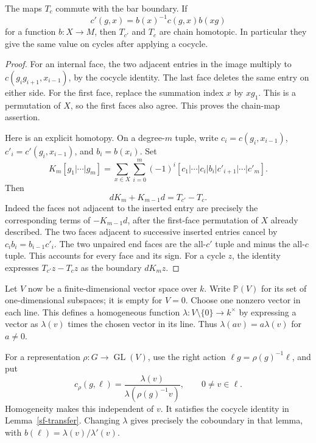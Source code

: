 \begin{lemma}\label{sf-transfer}
The maps \(T_c\) commute with the bar boundary.
If
\[
                c'(g,x)=b(x)^{-1}c(g,x)b(xg)
\]
for a function \(b:X\to M\), then \(T_{c'}\) and
\(T_c\) are chain homotopic.  In particular they give
the same value on cycles after applying a cocycle.
\end{lemma}
\begin{proof}
For an internal face, the two adjacent entries in
the image multiply to \(c(g_ig_{i+1},x_{i-1})\),
by the cocycle identity.  The last face deletes the
same entry on either side.  For the first face,
replace the summation index \(x\) by \(xg_1\).
This is a permutation of \(X\), so the first faces
also agree.  This proves the chain-map assertion.

Here is an explicit homotopy.  On a degree-\(m\) tuple,
write \(c_i=c(g_i,x_{i-1})\),
\(c'_i=c'(g_i,x_{i-1})\), and \(b_i=b(x_i)\).
Set
\[
 K_m[g_1|\cdots|g_m]
 =\sum_{x\in X}\sum_{i=0}^m(-1)^i
          [c_1|\cdots|c_i|b_i|c'_{i+1}|\cdots|c'_m].
\]
Then
\[
                    dK_m+K_{m-1}d=T_{c'}-T_c.
\]
Indeed the faces not adjacent to the inserted entry
are precisely the corresponding terms of
\(-K_{m-1}d\), after the first-face permutation of
\(X\) already described.  The two faces adjacent
to successive inserted entries cancel by
\(c_i b_i=b_{i-1}c'_i\).
The two unpaired end faces are the all-\(c'\) tuple
and minus the all-\(c\) tuple.
This accounts for every face and its sign.
For a cycle \(z\), the identity expresses
\(T_{c'}z-T_cz\) as the boundary \(dK_mz\).
\end{proof}

Let \(V\) now be a finite-dimensional vector space
over \(k\).  Write \(\mathbb P(V)\) for its set
of one-dimensional subspaces; it is empty for \(V=0\).
Choose one nonzero vector in each line.  This defines
a homogeneous function \(\lambda:V\setminus\{0\}\to k^\times\)
by expressing a vector as \(\lambda(v)\) times the
chosen vector in its line.  Thus
\(\lambda(av)=a\lambda(v)\) for \(a\ne0\).

For a representation \(\rho:G\to\operatorname{GL}(V)\),
use the right action \(\ell g=\rho(g)^{-1}\ell\),
and put
\[
                  c_\rho(g,\ell)
                    =\frac{\lambda(v)}{\lambda(\rho(g)^{-1}v)},
                    \qquad 0\ne v\in\ell.
\]
Homogeneity makes this independent of \(v\).
It satisfies the cocycle identity in
Lemma~\ref{sf-transfer}.
Changing \(\lambda\) gives precisely the coboundary
in that lemma, with
\(b(\ell)=\lambda(v)/\lambda'(v)\).

